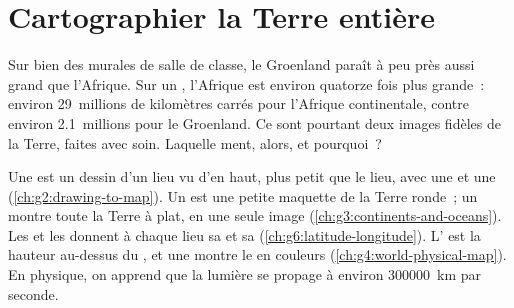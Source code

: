 \chapter{Cartographier la Terre entière}\label{ch:g9:maps-of-the-earth}

Sur bien des  murales de salle de classe, le Groenland paraît à peu
près aussi grand que l'Afrique. Sur un , l'Afrique est environ
quatorze fois plus grande~: environ 29~millions de kilomètres carrés pour
l'Afrique continentale, contre environ 2.1~millions pour le Groenland. Ce
sont pourtant deux images fidèles de la Terre, faites avec soin. Laquelle
ment, alors, et pourquoi~?

\begin{recall}
Une  est un dessin d'un lieu vu d'en haut, plus petit que le lieu,
avec une  et une  (\cref{ch:g2:drawing-to-map}). Un 
est une petite maquette de la Terre ronde~; un  montre toute la
Terre à plat, en une seule image (\cref{ch:g3:continents-and-oceans}). Les
 et les  donnent à chaque lieu sa  et sa
 (\cref{ch:g6:latitude-longitude}). L' est la hauteur
au-dessus du , et une  montre le  en
couleurs (\cref{ch:g4:world-physical-map}). En physique, on apprend que la
lumière se propage à environ \qty{300000}{km} par seconde.
\end{recall}

